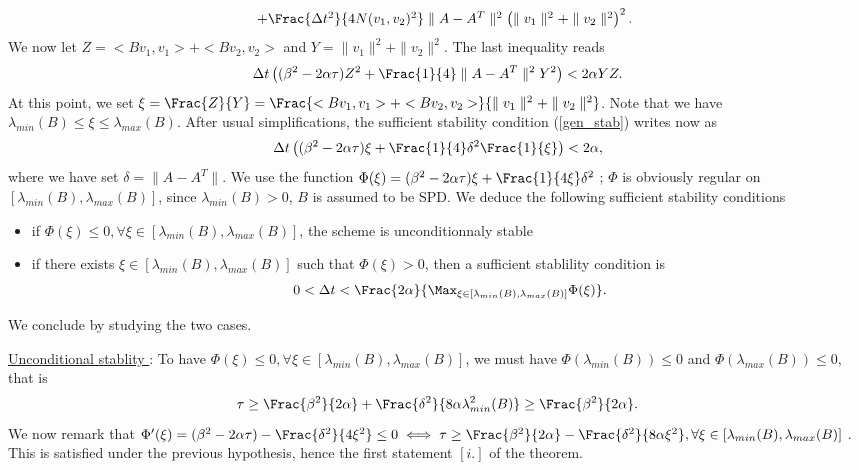 {\begin{proof_amiens}
$$\begin{array}{ll}
&+\Frac{\Delta t^2}{4N(v_1,v_2)^2}\parallel A-A^T\parallel^2\left( \parallel v_1\parallel^2+ \parallel v_2\parallel^2\right)^2. \\
\end{array}
$$
We now let $Z=<Bv_1,v_1>+<Bv_2,v_2>$ and $Y=\parallel v_1\parallel^2+ \parallel v_2\parallel^2$. The last inequality reads
$$
\Delta t \left( (\beta^2-2\alpha \tau)Z^2 +\Frac{1}{4}\parallel A-A^T\parallel^2 Y^2\right) < 2\alpha YZ .
$$
At this point, we set $\xi=\Frac{Z}{Y}=\Frac{<Bv_1,v_1>+<Bv_2,v_2>}{\parallel v_1\parallel^2+ \parallel v_2\parallel^2}$. Note that we have $\lambda_{min}(B)\le \xi \le \lambda_{max}(B)$.
After usual simplifications, the sufficient stability condition (\ref{gen_stab}) writes now as
$$
\Delta t \left( (\beta^2-2\alpha \tau)\xi + \Frac{1}{4}\delta^2\Frac{1}{\xi}\right) < 2\alpha,
$$
where we have set $\delta =\parallel A-A^T\parallel$.
We use the function $\Phi(\xi)= (\beta^2-2\alpha \tau)\xi + \Frac{1}{4\xi}\delta^2$ ; $\Phi$ is obviously regular on $[\lambda_{min}(B),\lambda_{max}(B)]$, since $\lambda_{min}(B) >0$, $B$ is assumed to be SPD.
We deduce the following sufficient stability conditions
\begin{itemize}
\item if $\Phi(\xi) \le 0, \forall \xi \in [\lambda_{min}(B),\lambda_{max}(B)]$, the scheme is unconditionnaly stable
\item if there exists $\xi \in [\lambda_{min}(B),\lambda_{max}(B)]$ such that $\Phi(\xi) >0$, then a sufficient stablility condition is
$$
0<\Delta t<\Frac{2\alpha}{\displaystyle{\Max_{\xi \in [\lambda_{min}(B),\lambda_{max}(B)]}\Phi(\xi)}}.
$$
\end{itemize}
We conclude by studying the two cases.


\underline{Unconditional stablity }:
To have $\Phi(\xi) \le 0, \forall \xi \in [\lambda_{min}(B),\lambda_{max}(B)]$, we must have
$\Phi(\lambda_{min}(B))\le 0$ and $\Phi(\lambda_{max}(B))\le 0$, that is
$$
\tau \ge \Frac{\beta^2}{2\alpha}+\Frac{\delta^2}{8\alpha \lambda^2_{min}(B)} \ge \Frac{\beta^2}{2\alpha}.
$$
We now remark that $\Phi'(\xi)=(\beta^2-2\alpha \tau) -\Frac{\delta^2}{4\xi^2} \le 0 \iff 
\tau \ge \Frac{\beta^2}{2\alpha}-\Frac{\delta^2}{8\alpha \xi^2}, \forall \xi \in [\lambda_{min}(B),\lambda_{max}(B)]$ . This is satisfied under the previous hypothesis, hence the first statement $[i.]$ of the theorem.



\end{proof_amiens}}
